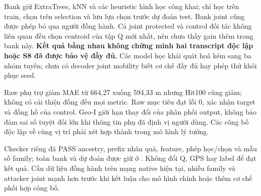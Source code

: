 Bank giữ ExtraTrees, kNN và các heuristic hình học công khai; chỉ học trên
train, chọn trên selection và lưu lựa chọn trước dự đoán test. Bank joint
cũng được phép bỏ qua người đồng hành. Cả joint protected và control đối
tác không liên quan đều chọn centroid của tập Q mới nhất, nên chưa thấy
gain thêm trong bank này. \textbf{Kết quả bằng nhau không chứng minh hai
transcript độc lập hoặc S8 đã được bảo vệ đầy đủ.} Các model học khái quát
hoá kém sang ba nhóm tuyến; chưa có decoder joint mobility biết cơ chế đầy
đủ hay phép thử khôi phục seed.

Raw phụ trợ giảm MAE từ 664,27 xuống 594,33 m nhưng Hit100 cũng giảm;
không có cải thiện đồng đều mọi metric. Raw mục tiêu đạt lỗi 0, xác nhận
target và đồng hồ của control. Geo-I giới hạn thay đổi của phân phối output,
không bảo đảm sai số tuyệt đối lớn khi thông tin phụ đã định vị người dùng.
Các công bố độc lập về cùng vị trí phải xét hợp thành trong mô hình lý
tưởng.~\citep{andres2013geoi,olteanu2017interdependent}

Checker riêng đã PASS ancestry, prefix nhân quả, feature, phép học/chọn và
mẫu số family; toàn bank và dự đoán được giữ ở
.
Không đổi Q, GPS hay label để đạt kết quả. Cần dữ liệu đồng hành trên mạng
native hiện tại, nhiều family và attacker joint mạnh hơn trước khi kết luận
cho mô hình chính hoặc thêm cơ chế phối hợp công bố.
